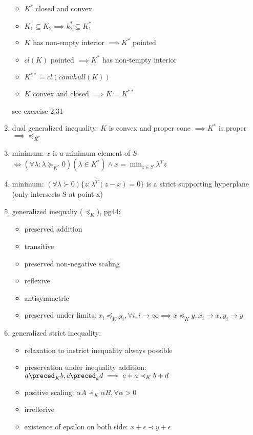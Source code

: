 \documentclass[12pt,letter]{article}
\begin{document}
\begin{enumerate}
  \begin{itemize}
  \item $K^*$ closed and convex
  \item $K_1 \subseteq K_2 \implies k_2^* \subseteq K_1^*$
  \item $K$ has non-empty interior $\implies K^*$ pointed
  \item $cl(K)$ pointed $\implies K^*$ has non-tempty interior
  \item $K^{**} = cl(convhull(K))$
  \item $K$ convex and closed $\implies K=K^{**}$
  \end{itemize}
  see exercise 2.31\\
\item dual generalized inequality: $K$ is convex and proper cone $\implies K^*$ is proper $\implies \preceq_{K^*}$
\item minimum: $x$ is a minimum element of $S$ $\iff (\forall \lambda : \lambda \succeq_{K^*} 0) (\lambda \in K^*) \wedge x=\min_{z\in S}\lambda^T z$
\item minimum: $(\forall \lambda \succ 0)\{z: \lambda^T(z-x)=0\}$ is a strict supporting hyperplane (only intersects S at point x)
\item generalized inequaliy ($\preceq_{K}$), pg44:
  \begin{itemize}
  \item preserved addition
  \item transitive
  \item preserved non-negative scaling
  \item reflexive
  \item antisymmetric
  \item preserved under limits: $x_i \preceq_K y_i, \forall i, i \to \infty \implies x \preceq_K y, x_i \to x, y_i \to y$
  \end{itemize}
\item generalized strict inequality:
  \begin{itemize}
  \item relaxation to instrict inequality always possible
  \item preservation under inequality addition: $a \preced_K b, c \preced_k d \implies c+a \prec_K b+d$
  \item positive scaling: $\alpha A \prec_K \alpha B, \forall \alpha >0$
  \item irreflecive
  \item existence of epsilon on both side: $x+\epsilon \prec y+\epsilon$
  \end{itemize}

\end{enumerate}
\end{document}
